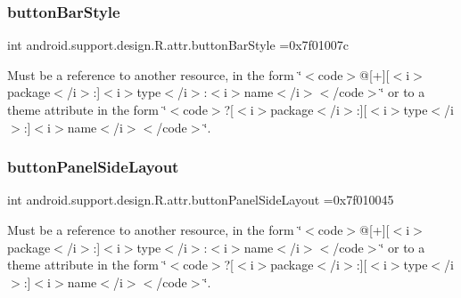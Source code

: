 \subsubsection{\texorpdfstring{button\+Bar\+Style}{buttonBarStyle}}
{\footnotesize\ttfamily int android.\+support.\+design.\+R.\+attr.\+button\+Bar\+Style =0x7f01007c\hspace{0.3cm}{\ttfamily [static]}}

Must be a reference to another resource, in the form \char`\"{}$<$code$>$@\mbox{[}+\mbox{]}\mbox{[}$<$i$>$package$<$/i$>$\+:\mbox{]}$<$i$>$type$<$/i$>$\+:$<$i$>$name$<$/i$>$$<$/code$>$\char`\"{} or to a theme attribute in the form \char`\"{}$<$code$>$?\mbox{[}$<$i$>$package$<$/i$>$\+:\mbox{]}\mbox{[}$<$i$>$type$<$/i$>$\+:\mbox{]}$<$i$>$name$<$/i$>$$<$/code$>$\char`\"{}. \mbox{\label{classandroid_1_1support_1_1design_1_1R_1_1attr_a0aa2e5b25e72f55f310faf2342f1cfaa}} 
\subsubsection{\texorpdfstring{button\+Panel\+Side\+Layout}{buttonPanelSideLayout}}
{\footnotesize\ttfamily int android.\+support.\+design.\+R.\+attr.\+button\+Panel\+Side\+Layout =0x7f010045\hspace{0.3cm}{\ttfamily [static]}}

Must be a reference to another resource, in the form \char`\"{}$<$code$>$@\mbox{[}+\mbox{]}\mbox{[}$<$i$>$package$<$/i$>$\+:\mbox{]}$<$i$>$type$<$/i$>$\+:$<$i$>$name$<$/i$>$$<$/code$>$\char`\"{} or to a theme attribute in the form \char`\"{}$<$code$>$?\mbox{[}$<$i$>$package$<$/i$>$\+:\mbox{]}\mbox{[}$<$i$>$type$<$/i$>$\+:\mbox{]}$<$i$>$name$<$/i$>$$<$/code$>$\char`\"{}. \mbox{\label{classandroid_1_1support_1_1design_1_1R_1_1attr_af1b31f0b5b93de1631dd3c9446564b39}} 
